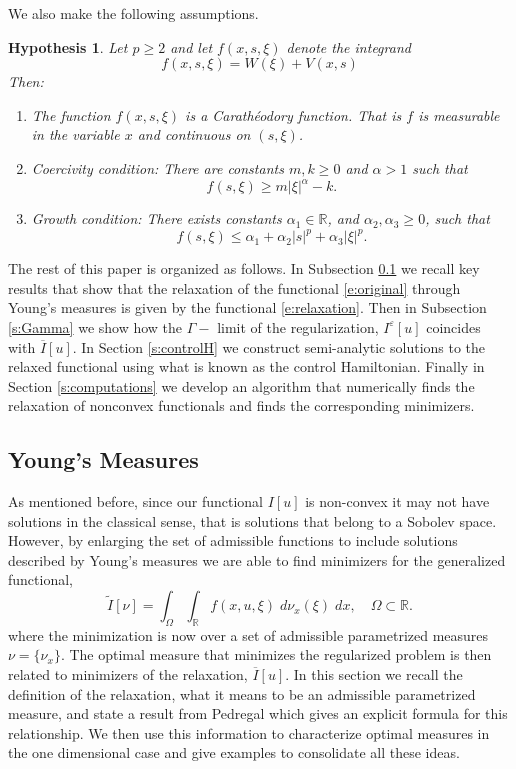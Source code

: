 \documentclass[11pt]{article}
\newcommand{\eps}{\varepsilon}
\newcommand{\R}{\mathbb{R}}
\theoremstyle{plain}
\newtheorem{Hypothesis}[Lemma]{Hypothesis}
\begin{document}
We also make the following assumptions.
\begin{Hypothesis}\label{h:main}
 Let $p\geq 2$ and let $f(x,s,\xi)$ denote the integrand
\[ f(x,s,\xi) = W(\xi) +V(x,s)\]
Then:
\begin{enumerate}
\item The function $f(x,s, \xi)$ is a Carath\'eodory function. That is $f$ is measurable in the variable $x$ and continuous on $(s,\xi)$.
\item Coercivity condition: There are constants  $m, k \geq 0$ and $\alpha >1$ such that
\[ f(s,\xi) \geq m |\xi|^\alpha -k.\]
\item Growth condition: There exists constants $\alpha_1 \in \R$, and  $\alpha_2, \alpha_3 \geq 0$, such that
\[ f(s,\xi) \leq \alpha_1+ \alpha_2 |s|^p + \alpha_3 |\xi|^p.\]
\end{enumerate}

\end{Hypothesis}



The rest of this paper is organized as follows. In Subsection \ref{s:young} we recall key results that show that the relaxation of the functional \eqref{e:original} through Young's measures is given by the functional \eqref{e:relaxation}. Then in Subsection \ref{s:Gamma} we show how the $\Gamma-$ limit of the regularization, $I^\eps[u]$ coincides with $\overline{I}[u]$. In Section \ref{s:controlH} we construct semi-analytic solutions to the relaxed functional using what is known as the control Hamiltonian. Finally in Section \ref{s:computations} we develop an algorithm that numerically finds the relaxation of nonconvex functionals and finds the corresponding minimizers. 



\subsection{Young's Measures}\label{s:young}

As mentioned before, since our functional $I[u]$ is non-convex it may not have solutions in the classical sense, that is solutions that belong to a Sobolev space. However, by enlarging the set of admissible functions to include solutions described by Young's measures we are able to find minimizers for the generalized functional,
\[ \tilde{I}[\nu] = \int_\Omega \int_{\R} f(x,u, \xi) \;d\nu_x(\xi)  \;dx, \quad \Omega  \subset \R. \]
where the minimization is now over a set of admissible parametrized measures $\nu=\{ \nu_x\}$.  The optimal measure that minimizes the regularized problem is then related to minimizers of the relaxation, $\overline{I}[u]$. In this section we recall the definition of the relaxation, what it means to be an admissible parametrized measure, and state a result  from Pedregal which gives an explicit formula for this relationship. We then use this information to characterize optimal measures in the one dimensional case and give examples to consolidate all these ideas.
\end{document}
